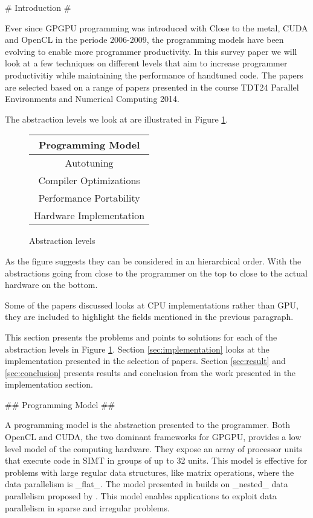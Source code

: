 \begin{markdown}

# Introduction #

Ever since GPGPU programming was introduced with Close to the metal,
CUDA and OpenCL in the periode 2006-2009, the programming models have
been evolving to enable more programmer productivity. 
In this survey paper we will look at a few techniques on different
levels that aim to increase programmer productivitiy while maintaining
the performance of handtuned code. The papers are selected based on a
range of papers presented in the course TDT24 Parallel Environments
and Numerical Computing 2014. 

The abstraction levels we look at are illustrated in Figure
\ref{fig:abstraction}.

\begin{figure}[H]
  \centering
  \begin{tabular}{|c|}
    \hline
    Programming Model \\
    \hline \hline
    Autotuning \\
    \hline \hline
    Compiler Optimizations \\
    \hline \hline
    Performance Portability \\
    \hline \hline
    Hardware Implementation \\
    \hline
  \end{tabular}
  \label{fig:abstraction}
  \caption{Abstraction levels}
\end{figure}

As the figure suggests they can be considered in an hierarchical
order. With the abstractions going from close to the programmer on the
top to close to the actual hardware on the bottom. 

Some of the papers discussed looks at CPU implementations rather than
GPU, they are included to highlight the fields mentioned in the previous
paragraph.

This section presents the problems and points to solutions for each of
the abstraction levels in Figure \ref{fig:abstraction}. Section
\ref{sec:implementation} looks at the implementation presented in the
selection of papers. Section \ref{sec:result} and \ref{sec:conclusion}
presents results and conclusion from the work presented in the
implementation section. 

## Programming Model ##

A programming model is the abstraction presented to the programmer.
Both OpenCL and CUDA, the two dominant frameworks for GPGPU, provides
a low level model of the computing hardware. They expose an array of
processor units that execute code in SIMT in groups of up to 32
units. This model is effective for problems with large regular data
structures, like matrix operations, where the data parallelism is
_flat_. The model presented in \cite{data-para} builds on _nested_
data parallelism proposed by \cite{bs90}. This model enables
applications to exploit data parallelism in sparse and irregular
problems.


\end{markdown}

